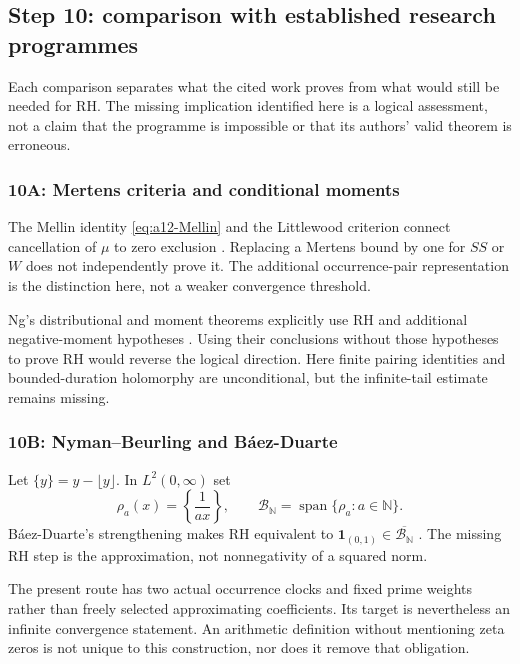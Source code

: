 \subsection{Step 10: comparison with established research programmes}
\label{subsec:a12-literature}
Each comparison separates what the cited work proves from what would
still be needed for RH. The missing implication identified here is a
logical assessment, not a claim that the programme is impossible or
that its authors' valid theorem is erroneous.

\subsubsection{10A: Mertens criteria and conditional moments}
\label{subsubsec:a12-lit-Mertens}
The Mellin identity \eqref{eq:a12-Mellin} and the Littlewood criterion
connect cancellation of $\mu$ to zero exclusion
\cite{Littlewood1912,Titchmarsh1986}.
Replacing a Mertens bound by one for $SS$ or $W$ does not independently
prove it. The additional occurrence-pair representation is the distinction
here, not a weaker convergence threshold.

Ng's distributional and moment theorems explicitly use RH and additional
negative-moment hypotheses \cite{Ng2004}. Using their conclusions without
those hypotheses to prove RH would reverse the logical direction.
Here finite pairing identities and bounded-duration holomorphy are
unconditional, but the infinite-tail estimate remains missing.

\subsubsection{10B: Nyman--Beurling and B\'aez-Duarte}
\label{subsubsec:a12-lit-NB}
Let $\{y\}=y-\lfloor y\rfloor$. In $L^2(0,\infty)$ set
\begin{equation}
\label{eq:a12-NB}
\rho_a(x)=\left\{\frac1{ax}\right\},\qquad
\mathcal B_{\mathbb N}=\operatorname{span}\{\rho_a:a\in\mathbb N\}.
\end{equation}
B\'aez-Duarte's strengthening makes RH equivalent to
$\mathbf1_{(0,1)}\in\overline{\mathcal B_{\mathbb N}}$
\cite{BaezDuarte2002}. The missing RH step is the approximation, not
nonnegativity of a squared norm.

The present route has two actual occurrence clocks and fixed prime
weights rather than freely selected approximating coefficients.
Its target is nevertheless an infinite convergence statement.
An arithmetic definition without mentioning zeta zeros is not unique
to this construction, nor does it remove that obligation.

